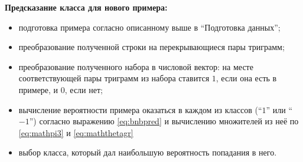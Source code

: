 \begin{samepage}
  \textbf{Предсказание класса для нового примера:}
  \begin{itemize}
    \setlength{\itemsep}{1pt}%
    \setlength{\parskip}{1pt}
  \item подготовка примера согласно описанному выше в ``Подготовка данных'';
  \item преобразование полученной строки на перекрывающиеся пары триграмм;
  \item преобразование полученного набора в числовой вектор: на месте соответствующей
    пары триграмм из набора ставится $1$, если она есть в примере, и $0$, если нет;
  \item вычисление вероятности примера оказаться в каждом из классов (``$1$'' или ``$-1$'') согласно выражению
    \ref{eq:bnbpred} и вычислению множителей из неё по \ref{eq:mathpi3} и \ref{eq:maththetagr}
  \item выбор класса, который дал наибольшую вероятность попадания в него.
  \end{itemize}
\end{samepage}
